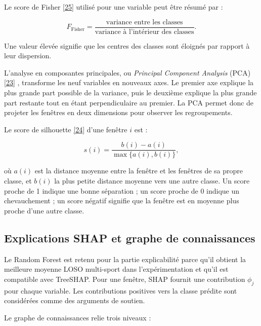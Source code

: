 \documentclass[12pt,a4paper]{article}
\newcommand{\openaccessref}[2]{%
  \nobreak\hspace{0.08em}%
  \href{#2}{\textcolor{green!35!black}{[#1]}}%
}
\begin{document}
Le score de Fisher\openaccessref{25}{https://arxiv.org/abs/1202.3725} utilisé pour une variable peut être résumé par :

\begin{equation}
F_{\mathrm{Fisher}}
=
\frac{\text{variance entre les classes}}
{\text{variance à l'intérieur des classes}}.
\label{eq:fisher}
\end{equation}

Une valeur élevée signifie que les centres des classes sont éloignés par
rapport à leur dispersion.

L'analyse en composantes principales, ou \emph{Principal Component Analysis}
(PCA)\openaccessref{23}{https://arxiv.org/abs/1404.1100}, transforme les neuf variables en nouveaux axes. Le premier axe explique
la plus grande part possible de la variance, puis le deuxième explique la
plus grande part restante tout en étant perpendiculaire au premier. La PCA
permet donc de projeter les fenêtres en deux dimensions pour observer les
regroupements.

Le score de silhouette\openaccessref{24}{https://wis.kuleuven.be/stat/robust/papers/publications-1987/rousseeuw-silhouettes-jcam-sciencedirectopenarchiv.pdf} d'une fenêtre $i$ est :

\begin{equation}
s(i)
=
\frac{b(i)-a(i)}
{\max\{a(i),b(i)\}},
\label{eq:silhouette}
\end{equation}

où $a(i)$ est la distance moyenne entre la fenêtre et les fenêtres de sa
propre classe, et $b(i)$ la plus petite distance moyenne vers une autre
classe. Un score proche de 1 indique une bonne séparation ; un score proche de
0 indique un chevauchement ; un score négatif signifie que la fenêtre est en
moyenne plus proche d'une autre classe.

\subsection{Explications SHAP et graphe de connaissances}

Le Random Forest est retenu pour la partie explicabilité parce qu'il obtient
la meilleure moyenne LOSO multi-sport dans l'expérimentation et qu'il est
compatible avec TreeSHAP. Pour une fenêtre, SHAP fournit une contribution
$\phi_j$ pour chaque variable. Les contributions positives vers la classe
prédite sont considérées comme des arguments de soutien.

Le graphe de connaissances relie trois niveaux :
\end{document}
